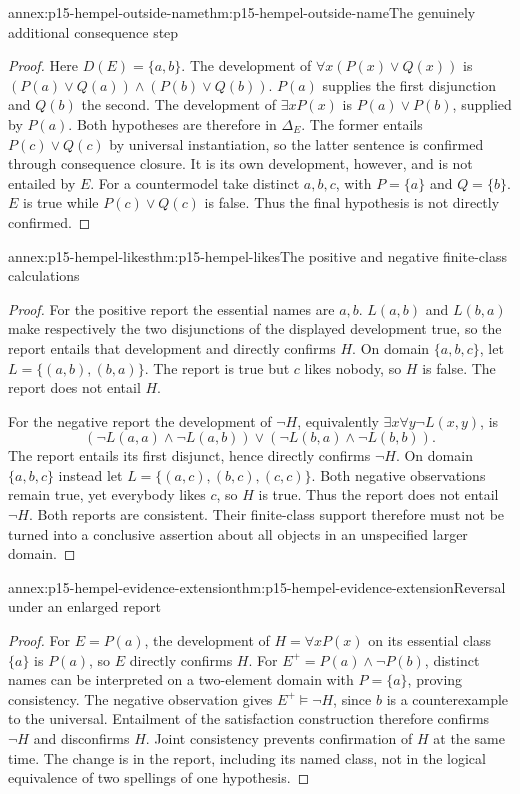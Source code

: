 \begin{annexitem}{annex:p15-hempel-outside-name}{thm:p15-hempel-outside-name}{The genuinely additional consequence step}
\begin{proof}
Here $D(E)=\{a,b\}$. The development of
$\forall x(P(x)\lor Q(x))$ is
$(P(a)\lor Q(a))\land(P(b)\lor Q(b))$.
$P(a)$ supplies the first disjunction and $Q(b)$ the second.
The development of $\exists xP(x)$ is $P(a)\lor P(b)$, supplied
by $P(a)$. Both hypotheses are therefore in $\Delta_E$.
The former entails $P(c)\lor Q(c)$ by universal instantiation, so
the latter sentence is confirmed through consequence closure.
It is its own development, however, and is not entailed by $E$.
For a countermodel take distinct $a,b,c$, with $P=\{a\}$ and
$Q=\{b\}$. $E$ is true while $P(c)\lor Q(c)$ is false.
Thus the final hypothesis is not directly confirmed.
\end{proof}
\end{annexitem}

\begin{annexitem}{annex:p15-hempel-likes}{thm:p15-hempel-likes}{The positive and negative finite-class calculations}
\begin{proof}
For the positive report the essential names are $a,b$.
$L(a,b)$ and $L(b,a)$ make respectively the two disjunctions of
the displayed development true, so the report entails that development
and directly confirms $H$. On domain $\{a,b,c\}$, let
$L=\{(a,b),(b,a)\}$. The report is true but $c$ likes nobody,
so $H$ is false. The report does not entail $H$.

For the negative report the development of $\neg H$, equivalently
$\exists x\forall y\neg L(x,y)$, is
\[
 (\neg L(a,a)\land\neg L(a,b))\lor
 (\neg L(b,a)\land\neg L(b,b)).
\]
The report entails its first disjunct, hence directly confirms $\neg H$.
On domain $\{a,b,c\}$ instead let
$L=\{(a,c),(b,c),(c,c)\}$. Both negative observations remain true,
yet everybody likes $c$, so $H$ is true. Thus the report does not
entail $\neg H$. Both reports are consistent. Their finite-class
support therefore must not be turned into a conclusive assertion
about all objects in an unspecified larger domain.
\end{proof}
\end{annexitem}

\begin{annexitem}{annex:p15-hempel-evidence-extension}{thm:p15-hempel-evidence-extension}{Reversal under an enlarged report}
\begin{proof}
For $E=P(a)$, the development of $H=\forall xP(x)$ on its essential
class $\{a\}$ is $P(a)$, so $E$ directly confirms $H$.
For $E^+=P(a)\land\neg P(b)$, distinct names can be interpreted
on a two-element domain with $P=\{a\}$, proving consistency.
The negative observation gives $E^+\models\neg H$, since $b$
is a counterexample to the universal. Entailment of the satisfaction
construction therefore confirms $\neg H$ and disconfirms $H$.
Joint consistency prevents confirmation of $H$ at the same time.
The change is in the report, including its named class, not in the
logical equivalence of two spellings of one hypothesis.
\end{proof}
\end{annexitem}

